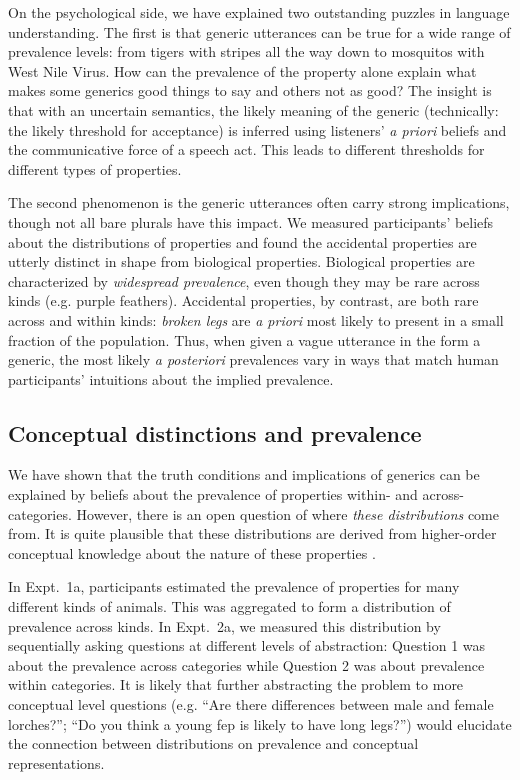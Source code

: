\documentclass[10pt,letterpaper]{article}
\begin{document}
On the psychological side, we have explained two outstanding puzzles in language understanding. 
The first is that generic utterances can be true for a wide range of prevalence levels: from tigers with stripes all the way down to mosquitos with West Nile Virus. 
How can the prevalence of the property alone explain what makes some generics good things to say and others not as good? 
The insight is that with an uncertain semantics, the likely meaning of the generic (technically: the likely threshold for acceptance) is inferred using listeners' \emph{a priori} beliefs and the communicative force of a speech act. 
This leads to different thresholds for different types of properties. 

The second phenomenon is the generic utterances often carry strong implications, though not all bare plurals have this impact. 
We measured participants' beliefs about the distributions of properties and found the accidental properties are utterly distinct in shape from biological properties.
Biological properties are characterized by \emph{widespread prevalence}, even though they may be rare across kinds (e.g. purple feathers).
Accidental properties, by contrast, are both rare across and within kinds: \emph{broken legs} are \emph{a priori} most likely to present in a small fraction of the population.
Thus, when given a vague utterance in the form a generic, the most likely \emph{a posteriori} prevalences vary in ways that match human participants' intuitions about the implied prevalence.


\subsection{Conceptual distinctions and prevalence}

We have shown that the truth conditions and implications of generics can be explained by beliefs about the prevalence of properties within- and across- categories. 
However, there is an open question of where \emph{these distributions} come from. 
It is quite plausible that these distributions are derived from higher-order conceptual knowledge about the nature of these properties \cite{Gelman2005, Keil1992}.

In Expt.~1a, participants estimated the prevalence of properties for many different kinds of animals. This was aggregated to form a distribution of prevalence across kinds.
In Expt.~2a, we measured this distribution by sequentially asking questions at different levels of abstraction: Question 1 was about the prevalence across categories while Question 2 was about prevalence within categories. 
It is likely that further abstracting the problem to more conceptual level questions (e.g. ``Are there differences between male and female lorches?''; ``Do you think a young fep is likely to have long legs?'') would elucidate the connection between distributions on prevalence and conceptual representations. 
\end{document}
